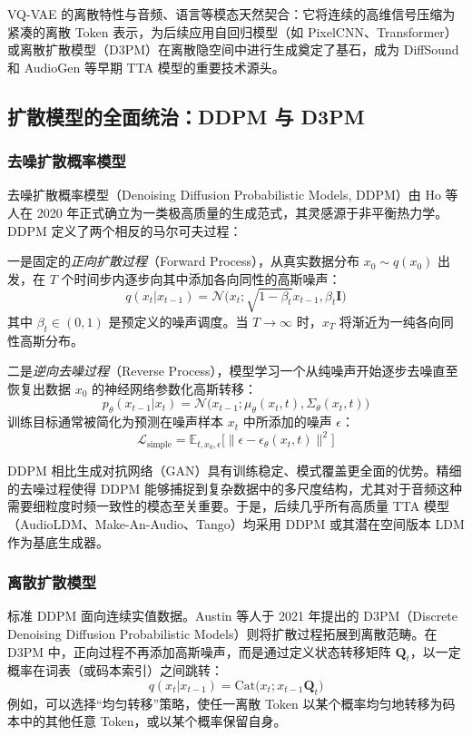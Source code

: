 \documentclass[12pt,a4paper]{article}
\begin{document}
VQ-VAE 的离散特性与音频、语言等模态天然契合：它将连续的高维信号压缩为紧凑的离散 Token 表示，为后续应用自回归模型（如 PixelCNN、Transformer）或离散扩散模型（D3PM）在离散隐空间中进行生成奠定了基石，成为 DiffSound 和 AudioGen 等早期 TTA 模型的重要技术源头。

\subsection{扩散模型的全面统治：DDPM 与 D3PM}

\subsubsection{去噪扩散概率模型}
去噪扩散概率模型（Denoising Diffusion Probabilistic Models, DDPM）由 Ho 等人在 2020 年正式确立为一类极高质量的生成范式，其灵感源于非平衡热力学。DDPM 定义了两个相反的马尔可夫过程：

一是固定的\emph{正向扩散过程}（Forward Process），从真实数据分布 \(x_0 \sim q(x_0)\) 出发，在 \(T\) 个时间步内逐步向其中添加各向同性的高斯噪声：
\begin{equation}
q(x_t | x_{t-1}) = \mathcal{N} \big( x_t; \sqrt{1 - \beta_t} x_{t-1}, \beta_t \mathbf{I} \big)
\end{equation}
其中 \(\beta_t \in (0,1)\) 是预定义的噪声调度。当 \(T \to \infty\) 时，\(x_T\) 将渐近为一纯各向同性高斯分布。

二是\emph{逆向去噪过程}（Reverse Process），模型学习一个从纯噪声开始逐步去噪直至恢复出数据 \(x_0\) 的神经网络参数化高斯转移：
\begin{equation}
p_\theta(x_{t-1} | x_t) = \mathcal{N} \big( x_{t-1}; \mu_\theta(x_t, t), \Sigma_\theta(x_t, t) \big)
\end{equation}
训练目标通常被简化为预测在噪声样本 \(x_t\) 中所添加的噪声 \(\epsilon\)：
\begin{equation}
\mathcal{L}_{\text{simple}} = \mathbb{E}_{t, x_0, \epsilon} \big[ \| \epsilon - \epsilon_\theta(x_t, t) \|^2 \big]
\end{equation}

DDPM 相比生成对抗网络（GAN）具有训练稳定、模式覆盖更全面的优势。精细的去噪过程使得 DDPM 能够捕捉到复杂数据中的多尺度结构，尤其对于音频这种需要细粒度时频一致性的模态至关重要。于是，后续几乎所有高质量 TTA 模型（AudioLDM、Make-An-Audio、Tango）均采用 DDPM 或其潜在空间版本 LDM 作为基底生成器。

\subsubsection{离散扩散模型}
标准 DDPM 面向连续实值数据。Austin 等人于 2021 年提出的 D3PM（Discrete Denoising Diffusion Probabilistic Models）则将扩散过程拓展到离散范畴。在 D3PM 中，正向过程不再添加高斯噪声，而是通过定义状态转移矩阵 \(\mathbf{Q}_t\)，以一定概率在词表（或码本索引）之间跳转：
\begin{equation}
q(x_t | x_{t-1}) = \text{Cat} \big( x_t; x_{t-1} \mathbf{Q}_t \big)
\end{equation}
例如，可以选择“均匀转移”策略，使任一离散 Token 以某个概率均匀地转移为码本中的其他任意 Token，或以某个概率保留自身。
\end{document}
